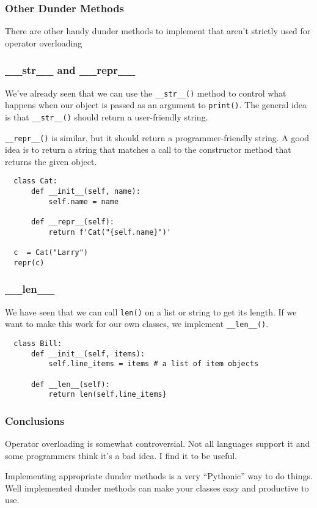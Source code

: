 \documentclass[10pt]{beamer}
\begin{document}
\begin{frame}
  \frametitle{Other Dunder Methods}
  
  There are other handy dunder methods to implement that aren't strictly 
  used for operator overloading 
  
\end{frame}

\begin{frame}[fragile]
  \frametitle{\_\_str\_\_  and \_\_repr\_\_}
  
  We've already seen that we can use the \texttt{\_\_str\_\_()}
  method to control what happens when our object is passed as an argument to 
  \texttt{print()}. The general idea is that \texttt{\_\_str\_\_()} should return 
  a user-friendly string.
  
  \vspace{5mm}
  \texttt{\_\_repr\_\_()} is similar, but it should return a programmer-friendly string. A
  good idea is to return a string that matches a call to the constructor method that returns
  the given object.
  
  \begin{verbatim}
  class Cat:
      def __init__(self, name):
          self.name = name
          
      def __repr__(self):
          return f'Cat("{self.name}")'
          
  c  = Cat("Larry")
  repr(c)                 
  \end{verbatim}           
  
\end{frame}

\begin{frame}[fragile]
  \frametitle{\_\_len\_\_}
  
  We have seen that we can call \texttt{len()} on a list or
  string to get its length. If we want to make this work for our own classes,
  we implement \texttt{\_\_len\_\_()}.

  \begin{verbatim}
  class Bill:
      def __init__(self, items):
          self.line_items = items # a list of item objects
          
      def __len__(self):
          return len(self.line_items}
  \end{verbatim}        

\end{frame}

\begin{frame}
  \frametitle{Conclusions}
  
   Operator overloading is somewhat controversial. Not all languages
   support it and some programmers think it's a bad idea. I find it 
   to be useful.
   
   Implementing appropriate dunder methods is a very ``Pythonic'' way to
   do things. Well implemented dunder methods can make your classes easy 
   and productive to use.
        
\end{frame}
\end{document}
